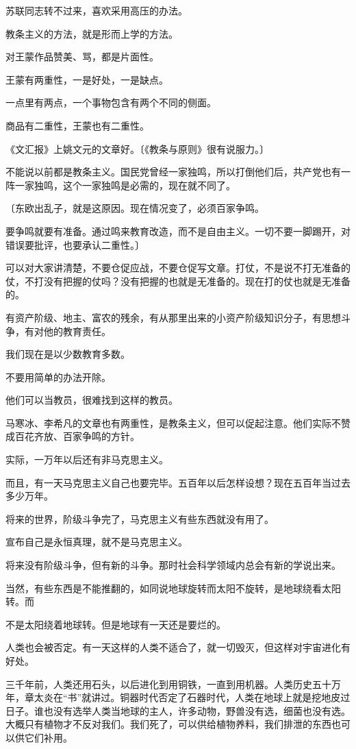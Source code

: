 苏联同志转不过来，喜欢采用高压的办法。

教条主义的方法，就是形而上学的方法。

对王蒙作品赞美、骂，都是片面性。

王蒙有两重性，一是好处，一是缺点。

一点里有两点，一个事物包含有两个不同的侧面。

商品有二重性，王蒙也有二重性。

《文汇报》上姚文元的文章好。〔《教条与原则》很有说服力。〕

不能说以前都是教条主义。国民党曾经一家独鸣，所以打倒他们后，共产党也有一阵一家独鸣，这个一家独鸣是必需的，现在就不同了。

〔东欧出乱子，就是这原因。现在情况变了，必须百家争鸣。

要争鸣就要有准备。通过鸣来教育改造，而不是自由主义。一切不要一脚踢开，对错误要批评，也要承认二重性。〕

可以对大家讲清楚，不要仓促应战，不要仓促写文章。打仗，不是说不打无准备的仗，不打没有把握的仗吗？没有把握的也就是无准备的。现在打的仗也就是无准备的。

有资产阶级、地主、富农的残余，有从那里出来的小资产阶级知识分子，有思想斗争，有对他的教育责任。

我们现在是以少数教育多数。

不要用简单的办法开除。

他们可以当教员，很难找到这样的教员。

马寒冰、李希凡的文章也有两重性，是教条主义，但可以促起注意。他们实际不赞成百花齐放、百家争鸣的方针。

实际，一万年以后还有非马克思主义。

而且，有一天马克思主义自己也要完毕。五百年以后怎样设想？现在五百年当过去多少万年。

将来的世界，阶级斗争完了，马克思主义有些东西就没有用了。

宣布自己是永恒真理，就不是马克思主义。

将来没有阶级斗争，但有新的斗争。那时社会科学领域内总会有新的学说出来。

当然，有些东西是不能推翻的，如同说地球旋转而太阳不旋转，是地球绕看太阳转。而

不是太阳绕着地球转。但是地球有一天还是要烂的。

人类也会被否定。有一天这样的人类不适合了，就一切毁灭，但这样对宇宙进化有好处。

三千年前，人类还用石头，以后进化到用铜铁，一直到用机器。人类历史五十万年，章太炎在“书”就讲过。铜器时代否定了石器时代，人类在地球上就是挖地皮过日子。谁也没有选举人类当地球的主人，许多动物，野兽没有选，细菌也没有选。大概只有植物才不反对我们。我们死了，可以供给植物养料，我们排泄的东西也可以供它们补用。

